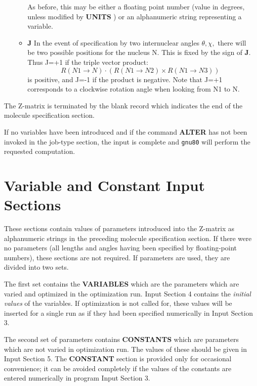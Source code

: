 \begin{enumerate}
\begin{itemize}
As before, this may be either a
floating point number (value in degrees, unless modified by {\bf UNITS} ) or
an alphanumeric string representing a variable.
\item {\bf J} In the event of specification by two internuclear angles
$\theta , \chi ,$ there will be two possible positions for the nucleus N.
This is fixed by the sign of {\bf J}. Thus J=+1 if the triple vector
product:
\[
R(N1 \rightarrow N) \cdot (R(N1 \rightarrow N2) \times R(N1 \rightarrow N3))
\]
is positive,  and J=-1 if the product is negative.
Note that J=+1 corresponds to a clockwise rotation angle when
looking from N1 to N.
\end{itemize}
\end{enumerate}
The Z-matrix is terminated by the blank record which indicates the
end of the molecule specification section. 

If no variables have been
introduced and if the command {\bf ALTER} has not been invoked in the
job-type section, the input is complete and {\tt gnu80} will perform
the requested computation.
\section{\sf Variable and Constant Input Sections}
These sections contain values of parameters introduced into the
Z-matrix as alphanumeric strings in the preceding molecule
specification section.  If there were no parameters (all lengths and
angles having been specified by floating-point numbers), these sections
are not required.  If parameters are used, they are divided into two
sets. 

The first set contains the {\bf VARIABLES} which are the parameters
which are varied and optimized in the optimization run. 
Input Section 4 contains the
{\em initial values} of the variables. If optimization is not called for,
these values will be inserted for a single run as if they had been
specified numerically in Input Section 3. 

The second set of parameters
contains {\bf CONSTANTS} which are parameters which are not varied in
optimization run. The values of these should be given in Input Section
5. The {\bf CONSTANT} section is provided only for occasional convenience; it
can be avoided completely if the values of the constants are entered
numerically in program Input Section 3.

